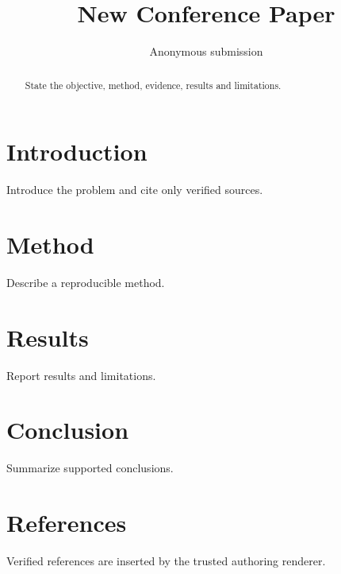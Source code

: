 \documentclass[10pt,twocolumn,letterpaper]{article}
\title{New Conference Paper}
\author{Anonymous submission}
\date{}
\begin{document}
\maketitle
\begin{abstract}State the objective, method, evidence, results and limitations.\end{abstract}
\section{Introduction}
Introduce the problem and cite only verified sources.
\section{Method}
Describe a reproducible method.
\section{Results}
Report results and limitations.
\section{Conclusion}
Summarize supported conclusions.
\section*{References}
Verified references are inserted by the trusted authoring renderer.
\end{document}
